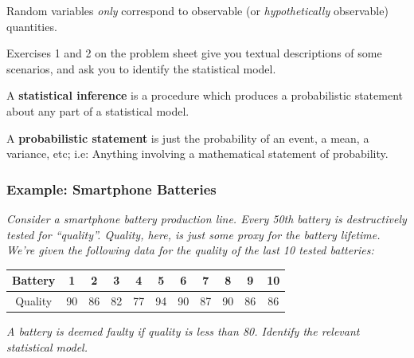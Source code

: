 \documentclass[a4paper]{article}
\begin{document}
            \begin{warn}
                Random variables \textit{only} correspond to observable (or
                \textit{hypothetically} observable) quantities.
            \end{warn}

            \begin{relq}
                Exercises 1 and 2 on the problem sheet give you textual
                descriptions of some scenarios, and ask you to identify the
                statistical model.
            \end{relq}

            \begin{definition}
                A \textbf{statistical inference} is a procedure which produces
                a probabilistic statement about any part of a
                statistical model.

                A \textbf{probabilistic statement} is just the probability of an
                event, a mean, a variance, etc; i.e: Anything involving a
                mathematical statement of probability.
            \end{definition}

            \subsubsection{Example: Smartphone Batteries}
                \textit{Consider a smartphone battery production line. Every
                50th battery is destructively tested for ``quality''. Quality,
                here, is just some proxy for the battery lifetime. We're given
                the following data for the quality of the last 10 tested
                batteries:}

                \begin{center}
                    \begin{tabular}{c | c c c c c c c c c c}
                        Battery & 1 & 2 & 3 & 4 & 5 & 6 & 7 & 8 & 9 & 10 \\
                        \hline
                        Quality & 90 & 86 & 82 & 77 & 94 & 90 & 87 & 90 & 86 &
                            86
                    \end{tabular}
                \end{center}

                \textit{A battery is deemed faulty if quality is less than 80.
                Identify the relevant statistical model.}
\end{document}
